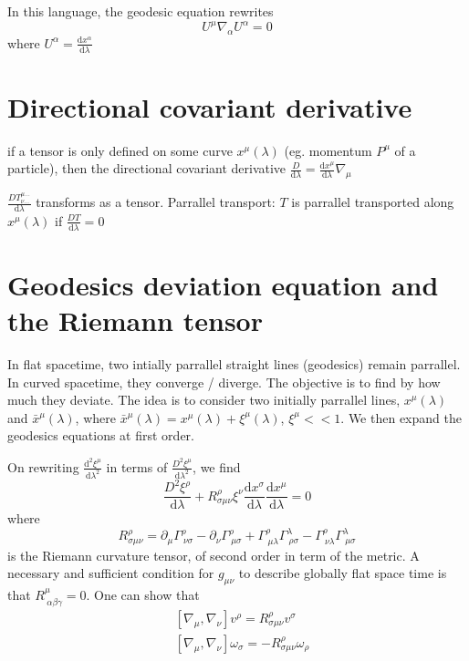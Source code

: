 \documentclass[a4paper]{book}
\theoremstyle{definition}
\theoremstyle{remark}
\begin{document}
In this language, the geodesic equation rewrites 
\begin{equation}
    U^\mu \nabla_\alpha U^\alpha = 0
\end{equation}
where $U^\alpha = \frac{\text{d}x^\alpha}{\text{d}\lambda}$

\section{Directional covariant derivative}

if a tensor is only defined on some curve $x^\mu(\lambda)$ (eg. momentum $P^\mu$ of a particle), then the directional covariant derivative $\frac{D}{\text{d}\lambda} = \frac{\text{d} x^\mu}{\text{d}\lambda} \nabla_\mu$\par \medskip 

$\frac{DT^{\mu\dots}_{\nu\dots}}{\text{d}\lambda}$ transforms as a tensor. Parrallel transport: $T$ is parrallel transported along $x^\mu(\lambda)$ if $\frac{DT}{\text{d}\lambda} = 0$


\section{Geodesics deviation equation and the Riemann tensor}

In flat spacetime, two intially parrallel straight lines (geodesics) remain parrallel. In curved spacetime, they converge / diverge. The objective is to find by how much they deviate. The idea is to consider two initially parrallel lines, $x^\mu(\lambda)$ and $\bar{x}^\mu(\lambda)$, where $\bar{x}^\mu(\lambda) = x^\mu(\lambda) + \xi^\mu(\lambda)$, $\xi^\mu << 1$. We then expand the geodesics equations at first order. \par \medskip 

On rewriting $\frac{\text{d}^2\xi^\mu}{\text{d}\lambda^2}$ in terms of $\frac{D^2\xi^\mu}{\text{d}\lambda^2}$, we find 
\begin{equation}
    \frac{D^2 \xi^\rho}{\text{d}\lambda} + R^\rho_{\sigma \mu\nu} \xi^\nu \frac{\text{d}x^\sigma}{\text{d}\lambda}\frac{\text{d}x^\mu}{\text{d}\lambda} = 0
\end{equation}
where 
\begin{equation}
    R^\rho_{\sigma \mu\nu} = \partial_\mu \Gamma^\rho_{~\nu\sigma} - \partial_\nu \Gamma^\rho_{~\mu\sigma} + \Gamma^\rho_{~\mu\lambda}\Gamma^\lambda_{~\rho\sigma} - \Gamma^\rho_{~\nu\lambda}\Gamma^\lambda_{~\mu\sigma}
\end{equation}
is the Riemann curvature tensor, of second order in term of the metric. A necessary and sufficient condition for $g_{\mu\nu}$ to describe globally flat space time is that $R^\mu_{~\alpha \beta\gamma} = 0$. One can show that 
\begin{equation}
    \begin{aligned}
        &[\nabla_\mu, \nabla_\nu] v^\rho = R^\rho_{\sigma \mu\nu} v^\sigma \\
        &[\nabla_\mu, \nabla_\nu] \omega_\sigma = - R^\rho_{\sigma \mu\nu} \omega_\rho 
    \end{aligned}
\end{equation}\bigskip 
\end{document}
